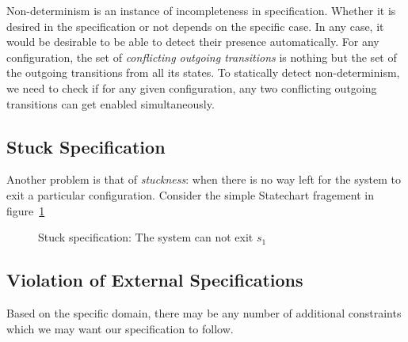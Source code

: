 \documentclass[12pt,a4paper]{article}
\begin{document}
Non-determinism is an instance of incompleteness in specification. Whether it is desired in the specification or not depends on the specific case. In any case, it would be desirable to be able to detect their presence automatically. For any configuration, the set of \emph{conflicting outgoing transitions} is nothing but the set of the outgoing transitions from all its states. To statically detect non-determinism, we need to check if for any given configuration, any two conflicting outgoing transitions can get enabled simultaneously.


\subsection{Stuck Specification}
Another problem is that of \emph{stuckness}: when there is no way left for the system to exit a particular configuration. Consider the simple Statechart fragement in figure~\ref{f:stuck}

\begin{figure}[H]

\caption{Stuck specification: The system can not exit $s_1$}
\label{f:stuck}
\end{figure}

\subsection{Violation of External Specifications}
Based on the specific domain, there may be any number of additional constraints which we may want our specification to follow. 
\end{document}
